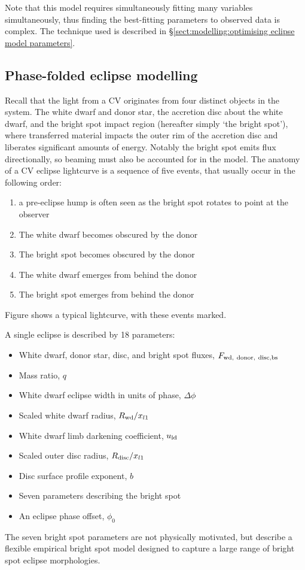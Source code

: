 Note that this model requires simultaneously fitting many variables simultaneously, thus finding the best-fitting parameters to observed data is complex. The technique used is described in \S\ref{sect:modelling:optimising eclipse model parameters}.

\subsection{Phase-folded eclipse modelling}
\label{sect:modelling:eclipse modelling}

Recall that the light from a CV originates from four distinct objects in the system. The white dwarf and donor star, the accretion disc about the white dwarf, and the bright spot impact region (hereafter simply `the bright spot'), where transferred material impacts the outer rim of the accretion disc and liberates significant amounts of energy. Notably the bright spot emits flux directionally, so beaming must also be accounted for in the model.
The anatomy of a CV eclipse lightcurve is a sequence of five events, that usually occur in the following order:
\begin{enumerate}
    \setlength\itemsep{0em}
    \item a pre-eclipse hump is often seen as the bright spot rotates to point at the observer
    \item The white dwarf becomes obscured by the donor
    \item The bright spot becomes obscured by the donor
    \item The white dwarf emerges from behind the donor
    \item The bright spot emerges from behind the donor
\end{enumerate}
Figure shows a typical lightcurve, with these events marked.

A single eclipse is described by 18 parameters:
\begin{itemize}
    \setlength\itemsep{0em}
    \item White dwarf, donor star, disc, and bright spot fluxes, $F_{\rm wd,\ donor,\ disc, bs}$
    \item Mass ratio, $q$
    \item White dwarf eclipse width in units of phase, $\Delta \phi$
    \item Scaled white dwarf radius, $R_{\rm wd} / x_{l1}$
    \item White dwarf limb darkening coefficient, $u_{\rm ld}$
    \item Scaled outer disc radius, $R_{\rm disc} / x_{l1}$
    \item Disc surface profile exponent, $b$
    \item Seven parameters describing the bright spot
    \item An eclipse phase offset, $\phi_0$
\end{itemize}
The seven bright spot parameters are not physically motivated, but describe a flexible empirical bright spot model designed to capture a large range of bright spot eclipse morphologies.

